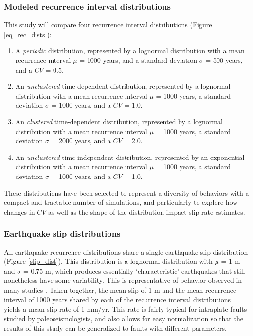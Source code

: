 \documentclass[se, manuscript]{copernicus}
\begin{document}
\subsubsection{Modeled recurrence interval
distributions}\label{modeled-recurrence-interval-distributions}

This study will compare four recurrence interval distributions (Figure
\ref{eq_rec_dists}):

\begin{enumerate}
\def\labelenumi{\arabic{enumi}.}
\item
  A \emph{periodic} distribution, represented by a lognormal
  distribution with a mean recurrence interval \(\mu\) = 1000 years, and
  a standard deviation \(\sigma\) = 500 years, and a \(CV\) = 0.5.
\item
  An \emph{unclustered} time-dependent distribution, represented by a
  lognormal distribution with a mean recurrence interval \(\mu\) = 1000
  years, a standard deviation \(\sigma\) = 1000 years, and a \(CV\) =
  1.0.
\item
  An \emph{clustered} time-dependent distribution, represented by a
  lognormal distribution with a mean recurrence interval \(\mu\) = 1000
  years, a standard deviation \(\sigma\) = 2000 years, and a \(CV\) =
  2.0.
\item
  An \emph{unclustered} time-independent distribution, represented by an
  exponential distribution with a mean recurrence interval \(\mu\) =
  1000 years, a standard deviation \(\sigma\) = 1000 years, and a
  \(CV\) = 1.0.
\end{enumerate}

These distributions have been selected to represent a diversity of
behaviors with a compact and tractable number of simulations, and
particularly to explore how changes in \(CV\) as well as the shape of
the distribution impact slip rate estimates.

\subsubsection{Earthquake slip
distributions}\label{earthquake-slip-distributions}

All earthquake recurrence distributions share a single earthquake slip
distribution (Figure \ref{slip_dist}). This distribution is a lognormal
distribution with \(\mu\) = 1 m and \(\sigma\) = 0.75 m, which produces
essentially `characteristic' earthquakes that still nonetheless have
some variability. This is representative of behavior observed in many
studies \citep[e.g.,][]{zielke_slip_2010, klinger_characteristic_2011,
zielke_earthquake_2018}. Taken together, the mean slip of 1 m and the
mean recurrence interval of 1000 years shared by each of the recurrence
interval distributions yields a mean slip rate of 1 mm/yr. This rate is
fairly typical for intraplate faults studied by paleoseismologists, and
also allows for easy normalization so that the results of this study can
be generalized to faults with different parameters.
\end{document}
